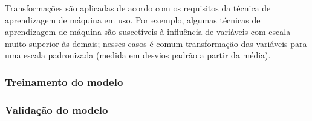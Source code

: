 Transformações são aplicadas de acordo com os requisitos da técnica de aprendizagem de máquina em uso. Por exemplo, algumas técnicas de aprendizagem
de máquina são suscetíveis à influência de variáveis com escala muito superior às demais; nesses casos é comum transformação das variáveis para uma escala
padronizada (medida em desvios padrão a partir da média).

\subsubsection{Treinamento do modelo}
\subsubsection{Validação do modelo}
